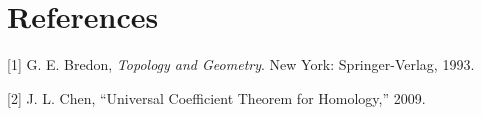\documentclass[10pt]{amsart}
\let\subsection\section
\let\section\chapter
\let\chapter\part
\begin{document}
\subsection*{References}

\hypertarget{refs}{}
\leavevmode\hypertarget{ref-Bre93}{}%
{[}1{]} G. E. Bredon, \emph{Topology and Geometry}. New York:
Springer-Verlag, 1993.

\leavevmode\hypertarget{ref-Che09}{}%
{[}2{]} J. L. Chen, ``Universal Coefficient Theorem for Homology,''
2009.
\end{document}
